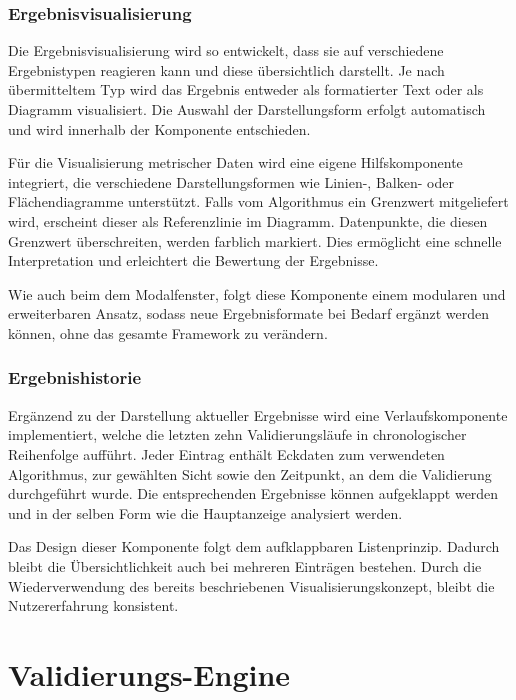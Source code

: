 \subsubsection*{Ergebnisvisualisierung}
\label{subsubsec:ergebnisvis}

Die Ergebnisvisualisierung wird so entwickelt, dass sie auf verschiedene Ergebnistypen reagieren kann und diese übersichtlich darstellt. Je nach übermitteltem Typ wird das Ergebnis entweder als formatierter Text oder als Diagramm visualisiert. Die Auswahl der Darstellungsform erfolgt automatisch und wird innerhalb der Komponente entschieden.

Für die Visualisierung metrischer Daten wird eine eigene Hilfskomponente integriert, die verschiedene Darstellungsformen wie Linien-, Balken- oder Flächendiagramme unterstützt. Falls vom Algorithmus ein Grenzwert mitgeliefert wird, erscheint dieser als Referenzlinie im Diagramm. Datenpunkte, die diesen Grenzwert überschreiten, werden farblich markiert. Dies ermöglicht eine schnelle Interpretation und erleichtert die Bewertung der Ergebnisse.

Wie auch beim dem Modalfenster, folgt diese Komponente einem modularen und erweiterbaren Ansatz, sodass neue Ergebnisformate bei Bedarf ergänzt werden können, ohne das gesamte Framework zu verändern.

\subsubsection*{Ergebnishistorie}
\label{subsubsec:ergebnisverlauf}


Ergänzend zu der Darstellung aktueller Ergebnisse wird eine Verlaufskomponente implementiert, welche die letzten zehn Validierungsläufe in chronologischer Reihenfolge aufführt. Jeder Eintrag enthält Eckdaten zum verwendeten Algorithmus, zur gewählten Sicht sowie den Zeitpunkt, an dem die Validierung durchgeführt wurde. Die entsprechenden Ergebnisse können aufgeklappt werden und in der selben Form wie die Hauptanzeige analysiert werden.

Das Design dieser Komponente folgt dem aufklappbaren Listenprinzip. Dadurch bleibt die Übersichtlichkeit auch bei mehreren Einträgen bestehen. Durch die Wiederverwendung des bereits beschriebenen Visualisierungskonzept, bleibt die Nutzererfahrung konsistent.

\section{Validierungs-Engine}

